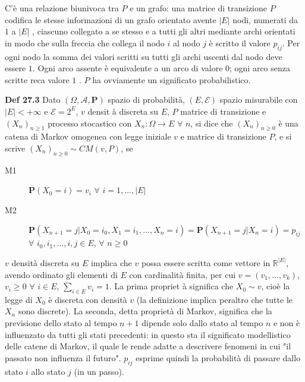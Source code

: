 \documentclass{article}
\begin{document}
C'\`{e} una relazione biunivoca tra $P$ e un grafo: una matrice di
transizione $P$ codifica le stesse informazioni di un grafo orientato avente 
$\left\vert E\right\vert $ nodi, numerati da $1$ a $\left\vert E\right\vert $%
, ciascuno collegato a se stesso e a tutti gli altri mediante archi
orientati in modo che sulla freccia che collega il nodo $i$ al nodo $j$ \`{e}
scritto il valore $p_{ij}$. Per ogni nodo la somma dei valori scritti su
tutti gli archi uscenti dal nodo deve essere $1$. Ogni arco assente \`{e}
equivalente a un arco di valore $0$; ogni arco senza scritte reca valore $1$%
. $P$ ha ovviamente un significato probabilistico.

\textbf{Def 27.3} Dato $\left( \Omega ,\mathcal{A},\mathbf{P}\right) $
spazio di probabilit\`{a}, $\left( E,\mathcal{E}\right) $ spazio misurabile
con $\left\vert E\right\vert <+\infty $ e $\mathcal{E}=2^{E}$, $v$ densit%
\`{a} discreta su $E$, $P$ matrice di transizione e $\left( X_{n}\right)
_{n\geq 1}$ processo stocastico con $X_{n}:\Omega \rightarrow E$ $\forall $ $%
n$, si dice che $\left( X_{n}\right) _{n\geq 0}$ \`{e} una catena di Markov
omogenea con legge iniziale $v$ e matrice di transizione $P$, e si scrive $%
\left( X_{n}\right) _{n\geq 0}\sim CM\left( v,P\right) $, se

\begin{description}
\item[M1] $\mathbf{P}\left( X_{0}=i\right) =v_{i}$ $\forall $ $%
i=1,...,\left\vert E\right\vert $

\item[M2] $\mathbf{P}\left(
X_{n+1}=j|X_{0}=i_{0},X_{1}=i_{1},...,X_{n}=i\right) =\mathbf{P}\left(
X_{n+1}=j|X_{n}=i\right) =p_{ij}$ $\forall $ $i_{0},i_{1},...,i,j\in E$, $%
\forall $ $n\geq 0$
\end{description}

$v$ densit\`{a} discreta su $E$ implica che $v$ possa essere scritta come
vettore in $%
\mathbb{R}
^{\left\vert E\right\vert }$, avendo ordinato gli elementi di $E$ con
cardinalit\`{a} finita, per cui $v=\left( v_{1},...,v_{k}\right) $, $%
v_{i}\geq 0$ $\forall $ $i\in E$, $\sum_{i\in E}v_{i}=1$. La prima propriet%
\`{a} significa che $X_{0}\sim v$, cio\`{e} la legge di $X_{0}$ \`{e}
discreta con densit\`{a} $v$ (la definizione implica peraltro che tutte le $%
X_{n}$ sono discrete). La seconda, detta propriet\`{a} di Markov, significa
che la previsione dello stato al tempo $n+1$ dipende solo dallo stato al
tempo $n$ e non \`{e} influenzato da tutti gli stati precedenti: in questo
sta il significato modellistico delle catene di Markov, il quale le rende
adatte a descrivere fenomeni in cui "il passato non influenza il futuro". $%
p_{ij}$ esprime quindi la probabilit\`{a} di passare dallo stato $i$ allo
stato $j$ (in un passo).
\end{document}
